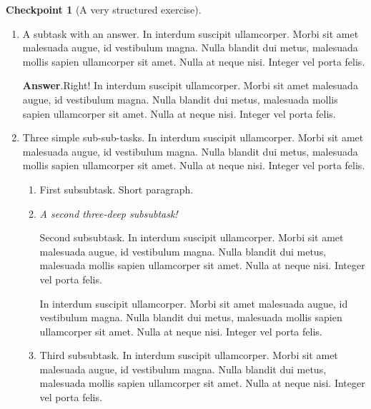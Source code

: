 \documentclass{amsart}
\theoremstyle{plain}%
\theoremstyle{definition}%
\newtheorem{inlineexercise}[theorem]{Checkpoint}
\theoremstyle{remark}%
\newcommand{\blocktitlefont}{\relax}
\newcommand{\lititle}[1]{{\slshape#1}}
\numberwithin{equation}{section}
\begin{document}
\begin{inlineexercise}[A very structured exercise]
\begin{enumerate}[font=\bfseries,label=(\alph*),ref=\alph*]
\begin{enumerate}[font=\bfseries,label=(\roman*),ref=\theenumi.\roman*]
A really simple subtask.  In interdum suscipit ullamcorper. Morbi sit amet malesuada augue, id vestibulum magna. Nulla blandit dui metus, malesuada mollis sapien ullamcorper sit amet. Nulla at neque nisi. Integer vel porta felis.%
\par
A short paragraph, before an answer.%
\par\smallskip%
\noindent\textbf{\blocktitlefont Answer}.\hypertarget{exercise-structured-5-3-3}{}\quad{}With a proof.%
\begin{proof}\label{exercise-structured-5-3-3-2}%
In interdum suscipit ullamcorper. Morbi sit amet malesuada augue, id vestibulum magna. Nulla blandit dui metus, malesuada mollis sapien ullamcorper sit amet. Nulla at neque nisi. Integer vel porta felis.%
\end{proof}
And a bit more to say.%
\item{}A subtask with an answer.  In interdum suscipit ullamcorper. Morbi sit amet malesuada augue, id vestibulum magna. Nulla blandit dui metus, malesuada mollis sapien ullamcorper sit amet. Nulla at neque nisi. Integer vel porta felis.%
\par\smallskip%
\noindent\textbf{\blocktitlefont Answer}.\hypertarget{exercise-structured-5-4-2}{}\quad{}Right!  In interdum suscipit ullamcorper. Morbi sit amet malesuada augue, id vestibulum magna. Nulla blandit dui metus, malesuada mollis sapien ullamcorper sit amet. Nulla at neque nisi. Integer vel porta felis.%
\item{}Three simple sub-sub-tasks.  In interdum suscipit ullamcorper. Morbi sit amet malesuada augue, id vestibulum magna. Nulla blandit dui metus, malesuada mollis sapien ullamcorper sit amet. Nulla at neque nisi. Integer vel porta felis.%
\begin{enumerate}[font=\bfseries,label=(\Alph*),ref=\theenumi.\theenumii.\Alph*]%
\item{}First subsubtask.  Short paragraph.%
\item{}\lititle{A second three-deep subsubtask!}\par%
Second subsubtask.  In interdum suscipit ullamcorper. Morbi sit amet malesuada augue, id vestibulum magna. Nulla blandit dui metus, malesuada mollis sapien ullamcorper sit amet. Nulla at neque nisi. Integer vel porta felis.%
\par
In interdum suscipit ullamcorper. Morbi sit amet malesuada augue, id vestibulum magna. Nulla blandit dui metus, malesuada mollis sapien ullamcorper sit amet. Nulla at neque nisi. Integer vel porta felis.%
\item{}Third subsubtask.  In interdum suscipit ullamcorper. Morbi sit amet malesuada augue, id vestibulum magna. Nulla blandit dui metus, malesuada mollis sapien ullamcorper sit amet. Nulla at neque nisi. Integer vel porta felis.%

\end{enumerate}
\end{enumerate}
\end{enumerate}
\end{inlineexercise}
\end{document}
